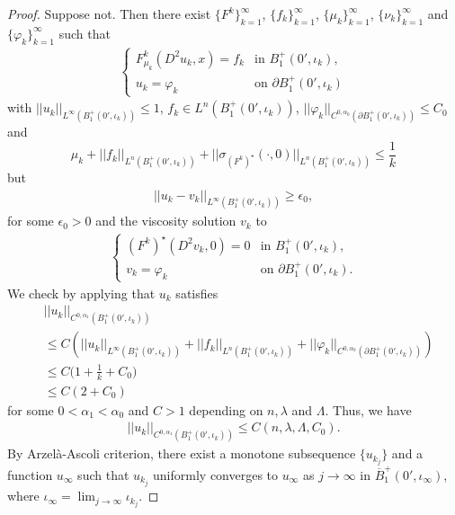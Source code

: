 \documentclass[11pt, reqno]{amsart}
\numberwithin{equation}{section}
\begin{document}
\begin{proof}
Suppose not.
Then there exist $\{ F^{k} \}_{k=1}^{\infty}$, $\{ f_{k} \}_{k=1}^{\infty}$, $\{ \mu_{k} \}_{k=1}^{\infty}$, $\{ \nu_{k} \}_{k=1}^{\infty}$ and $\{ \varphi_{k} \}_{k=1}^{\infty}$
such that
\begin{align*}
\left\{ \begin{array}{ll}
F_{\mu_{k}}^{k}(D^{2}u_{k},x) = f_{k} & \textrm{in $B_{1}^{+}(0',\iota_k), $}\\
u_{k}=\varphi_{k} & \textrm{on $\partial B_{1}^{+}(0',\iota_k)$}
\end{array} \right.
\end{align*}
with $||u_{k}||_{L^{\infty}(B_{1}^{+}(0',\iota_k))} \le 1$,
$f_{k} \in L^{n}(B_{1}^{+}(0',\iota_k)) $, $||\varphi_k||_{C^{0,\alpha_0}(\partial B_{1}^{+}(0',\iota_k))}\le C_0$ and
$$\mu_{k} + ||f_{k}||_{L^{n}(B_{1}^{+}(0',\iota_k)) }+||\sigma_{(F^{k})^{\star}}(\cdot,0)||_{L^{n}(B_{1}^{+}(0',\iota_k)) } \le \frac{1}{k}$$
but \begin{align}\label{add1}||u_{k}-v_{k}||_{L^{\infty}(B_{1}^{+}(0',\iota_k))} \ge \epsilon_{0} ,
\end{align}
for some $\epsilon_{0}>0$ and  the viscosity solution $v_{k}$ to
\begin{align*}
\left\{ \begin{array}{ll}
(F^{k})^{\star}(D^{2}v_{k},0) = 0 & \textrm{in $B_{1}^{+}(0',\iota_k), $}\\
v_{k}=\varphi_{k}  & \textrm{on $\partial B_{1}^{+}(0',\iota_k) $.} 
\end{array} \right.
\end{align*}
We check by applying \cite[Theorem 1.10]{MR2486925} that $u_{k}$ satisfies
\begin{align*}
&||u_{k}||_{C^{0,\alpha_{1}}(B_{1}^{+}(0',\iota_k))}
\\& \le C(||u_{k}||_{L^{\infty}(B_{1}^{+}(0',\iota_k))}+||f_{k}||_{L^{n}(B_{1}^{+}(0',\iota_k))} +
||\varphi_{k}||_{C^{0,\alpha_0}(\partial B_{1}^{+}(0',\iota_k))} )
\\ & \le C \bigg( 1+ \frac{1}{k}   +C_0\bigg)
\\ & \le C(2+C_{0} )
\end{align*}
for some $0<\alpha_{1}<\alpha_{0}$ and $C>1$ depending on $n,\lambda$ and $\Lambda $.
Thus, we have
\begin{align*}
||u_{k}||_{C^{0,\alpha_{1}}(B_{1}^{+}(0',\iota_k))}  \le C(n,\lambda, \Lambda,C_{0}).
\end{align*}
By Arzel\`{a}-Ascoli criterion, there exist a monotone subsequence $\{ u_{k_{j}} \}$ and a function $u_{\infty}$
such that $u_{k_{j}}$ uniformly converges to $u_{\infty}$ as $j \to \infty$ in $\overline{B}_{1}^{+}(0',\iota_{\infty})$,
where $\iota_{\infty}=\lim_{j\to\infty}\iota_{k_j}$.



\end{proof}
\end{document}
